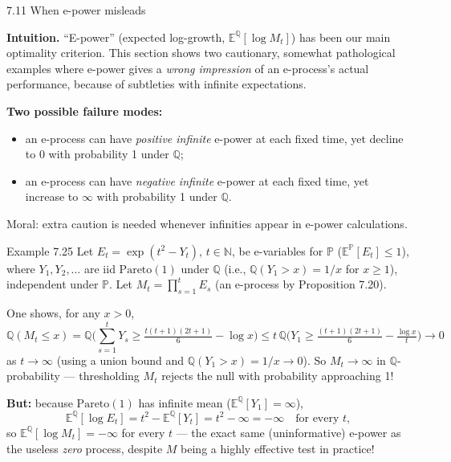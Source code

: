 \documentclass[aspectratio=169,10pt]{beamer}
\newcommand{\Nmb}{\mathbb{N}}
\begin{document}
\begin{frame}[allowframebreaks]{7.11 When e-power misleads}

\textbf{Intuition.} ``E-power'' (expected log-growth, $\mathbb E^{\mathbb Q}[\log M_t]$) has been our main
optimality criterion. This section shows two cautionary, somewhat pathological examples where e-power gives a
\emph{wrong impression} of an e-process's actual performance, because of subtleties with infinite expectations.

\textbf{Two possible failure modes:}
\begin{itemize}
\item[(a)] an e-process can have \emph{positive infinite} e-power at each fixed time, yet decline to $0$ with
probability 1 under $\mathbb Q$;
\item[(b)] an e-process can have \emph{negative infinite} e-power at each fixed time, yet increase to $\infty$ with
probability 1 under $\mathbb Q$.
\end{itemize}
Moral: extra caution is needed whenever infinities appear in e-power calculations.

\framebreak

\begin{block}{Example 7.25}
Let $E_t = \exp(t^2 - Y_t)$, $t\in\Nmb$, be e-variables for $\mathbb P$ ($\mathbb E^{\mathbb P}[E_t]\le1$), where
$Y_1,Y_2,\dots$ are iid $\mathrm{Pareto}(1)$ under $\mathbb Q$ (i.e., $\mathbb Q(Y_1 > x) = 1/x$ for $x \ge 1$),
independent under $\mathbb P$. Let $M_t = \prod_{s=1}^t E_s$ (an e-process by Proposition 7.20).

One shows, for any $x > 0$,
$$\mathbb Q(M_t \le x) = \mathbb Q\Big(\sum_{s=1}^t Y_s \ge \tfrac{t(t+1)(2t+1)}{6} - \log x\Big) \le t\,\mathbb Q\Big(Y_1 \ge \tfrac{(t+1)(2t+1)}{6} - \tfrac{\log x}{t}\Big) \to 0$$
as $t \to \infty$ (using a union bound and $\mathbb Q(Y_1 > x) = 1/x \to 0$). So $M_t \to \infty$ in
$\mathbb Q$-probability --- thresholding $M_t$ rejects the null with probability approaching 1!

\textbf{But:} because $\mathrm{Pareto}(1)$ has infinite mean ($\mathbb E^{\mathbb Q}[Y_1] = \infty$),
$$\mathbb E^{\mathbb Q}[\log E_t] = t^2 - \mathbb E^{\mathbb Q}[Y_t] = t^2 - \infty = -\infty \quad \text{for every } t,$$
so $\mathbb E^{\mathbb Q}[\log M_t] = -\infty$ for every $t$ --- the exact same (uninformative) e-power as the
useless \emph{zero} process, despite $M$ being a highly effective test in practice!
\end{block}

\end{frame}
\end{document}
